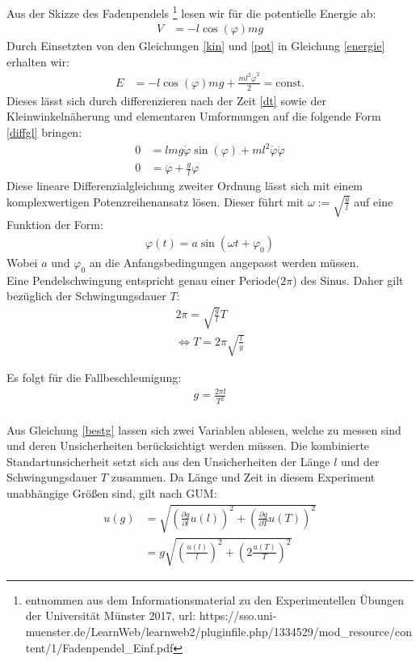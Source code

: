 Aus der Skizze des Fadenpendels \footnote{entnommen aus dem Informationsmaterial zu den Experimentellen Übungen der Universität Münster 2017, url: https://sso.uni-muenster.de/LearnWeb/learnweb2/pluginfile.php/1334529/mod\_resource/content/1/Fadenpendel\_Einf.pdf }  lesen wir für die potentielle Energie ab:
\begin{align}
V&=-l \cos (\varphi) m g
\label{pot}
\end{align}
Durch Einsetzten von den Gleichungen \cref{kin} und \cref{pot} in Gleichung \cref{energie} erhalten wir:
\begin{align}
E&=-l \cos (\varphi) m g +\frac{ml^2\dot{\varphi}^2}{2}=\textrm{const.}
\end{align}
Dieses lässt sich durch differenzieren nach der Zeit \cref{dt} sowie der Kleinwinkelnäherung und elementaren Umformungen auf die folgende Form \cref{diffgl} bringen:
\begin{align}
	0&=lmg \dot{\varphi}\sin (\varphi) +ml^2 \dot{\varphi} \ddot{\varphi}
	\label{dt} \\
	0&=\ddot{\varphi}+\frac{g}{l} \varphi
	\label{diffgl}
\end{align}
Diese lineare Differenzialgleichung zweiter Ordnung lässt sich mit einem komplexwertigen Potenzreihenansatz lösen. Dieser führt mit $\omega:=\sqrt{\frac{g}{l}}$ auf eine Funktion der Form: 
\begin{align}
\varphi(t)=a \sin (\omega t + \varphi_0)
\end{align}
Wobei $a$ und $\varphi_0$ an die Anfangsbedingungen angepasst werden müssen.\\
Eine Pendelschwingung entspricht genau einer Periode($2\pi$) des Sinus. Daher gilt bezüglich der Schwingungsdauer $T$:
\begin{align}
	2\pi = \sqrt{\frac{g}{l}} T \\
	\Leftrightarrow T= 2 \pi \sqrt{\frac{l}{g}}
\end{align}

Es folgt für die Fallbeschleunigung:
\begin{align}
g=\frac{2 \pi l}{T^2}
\label{bestg}
\end{align}\\



Aus Gleichung \ref{bestg} lassen sich zwei Variablen ablesen, welche zu messen sind und deren Unsicherheiten berücksichtigt werden müssen. Die kombinierte Standartunsicherheit setzt sich aus den Unsicherheiten der Länge $l$ und der Schwingungsdauer $T$ zusammen. Da Länge und Zeit in diesem Experiment unabhängige Größen sind, gilt nach GUM:
\begin{align}
u(g)&=\sqrt{\left(\frac{\partial g}{\partial l} u(l)\right)^2 + \left(\frac{\partial g}{\partial T}u(T)\right)^2 } \\
   &= g \sqrt{\left(\frac{u(l)}{l}\right)^2+ \left(2 \frac{ u(T)}{T}\right)^2 }
   \label{kombu}
\end{align}  





